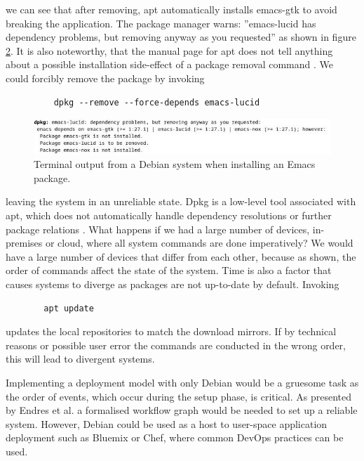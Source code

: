 we can see that after removing, apt automatically installs emacs-gtk
to avoid breaking the application. The package manager warns:
''emacs-lucid has dependency problems, but removing anyway as you
requested'' as shown in figure \ref{deb_remove}. It is also noteworthy,
that the manual page for apt does not tell anything about a possible
installation side-effect of a package removal command
\cite{ubuntuUbuntuManpage}. We could forcibly remove the package by
invoking
\begin{figure}[H]\label{dpkgsnippet}
\begin{lstlisting} 
    dpkg --remove --force-depends emacs-lucid
\end{lstlisting}
\end{figure}
\begin{figure}[b]\label{deb_remove}
\includegraphics[scale=2.0]{latex/kuvat/cropped_apt_output.jpg}
\caption[Terminal output from Emacs installation.]{Terminal output from a Debian system when installing an Emacs package.}
\end{figure}
leaving the system in an unreliable state. Dpkg is a low-level
tool associated with apt, which does not automatically handle dependency
resolutions or further package relations
\cite{thiruvathukal2004gentoo}. What happens if we had a large number
of devices, in-premises or cloud, where all system commands are done
imperatively? We would have a large number of devices that differ from
each other, because as shown, the order of commands affect the state
of the system. Time is also a factor that
causes systems to diverge as packages are not up-to-date by
default. Invoking 
\begin{figure}[H]\label{aptupdate}
\begin{lstlisting} 
  apt update
\end{lstlisting}
\end{figure}
updates the local repositories to match the download mirrors. If by
technical reasons or possible user error the commands are conducted in
the wrong order, this will lead to divergent systems.

Implementing a deployment model with only Debian would be a gruesome
task as the order of events, which occur during the setup phase, is
critical. As presented by Endres et al. \cite{endres2017declarative} a formalised workflow graph
would be needed to set up a reliable system. However, Debian could
be used as a host to user-space application deployment such as
Bluemix or Chef, where common DevOps practices can be used.

